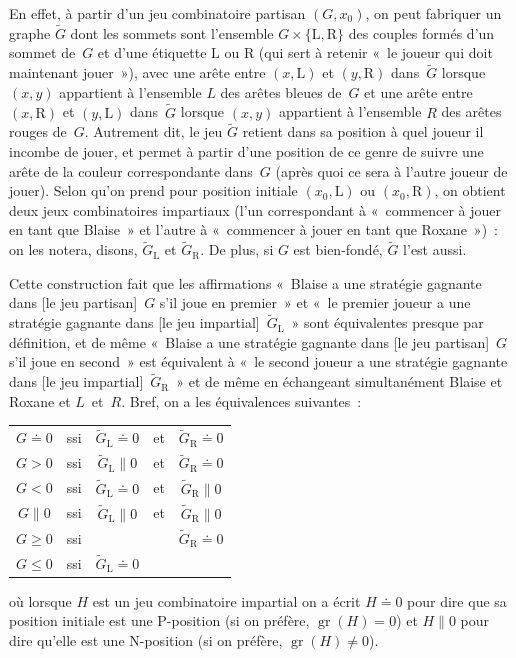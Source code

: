 \documentclass[12pt,a4paper]{article}
\theoremstyle{definition}
\newcommand{\gr}{\operatorname{gr}}
\newcommand{\fuzzy}{\mathrel{\|}}
\begin{document}
En effet, à partir d'un jeu combinatoire partisan $(G,x_0)$, on peut
fabriquer un graphe $\tilde G$ dont les sommets sont l'ensemble $G
\times \{\mathrm{L},\mathrm{R}\}$ des couples formés d'un sommet
de $G$ et d'une étiquette $\mathrm{L}$ ou $\mathrm{R}$ (qui sert à
retenir « le joueur qui doit maintenant jouer »), avec une arête entre
$(x,\mathrm{L})$ et $(y,\mathrm{R})$ dans $\tilde G$ lorsque $(x,y)$
appartient à l'ensemble $L$ des arêtes bleues de $G$ et une arête
entre $(x,\mathrm{R})$ et $(y,\mathrm{L})$ dans $\tilde G$ lorsque
$(x,y)$ appartient à l'ensemble $R$ des arêtes rouges de $G$.
Autrement dit, le jeu $\tilde G$ retient dans sa position à quel
joueur il incombe de jouer, et permet à partir d'une position de ce
genre de suivre une arête de la couleur correspondante dans $G$ (après
quoi ce sera à l'autre joueur de jouer).  Selon qu'on prend pour
position initiale $(x_0,\mathrm{L})$ ou $(x_0,\mathrm{R})$, on obtient
deux jeux combinatoires impartiaux (l'un correspondant à « commencer à
  jouer en tant que Blaise » et l'autre à « commencer à jouer en tant
  que Roxane ») : on les notera, disons, $\tilde G_{\mathrm{L}}$ et
$\tilde G_{\mathrm{R}}$.  De plus, si $G$ est bien-fondé, $\tilde G$
l'est aussi.

Cette construction fait que les affirmations « Blaise a une stratégie
  gagnante dans [le jeu partisan] $G$ s'il joue en premier » et « le
  premier joueur a une stratégie gagnante dans [le jeu
    impartial] $\tilde G_{\mathrm{L}}$ » sont équivalentes presque par
définition, et de même « Blaise a une stratégie gagnante dans [le jeu
    partisan] $G$ s'il joue en second » est équivalent à « le second
  joueur a une stratégie gagnante dans [le jeu impartial] $\tilde
  G_{\mathrm{R}}$ » et de même en échangeant simultanément Blaise et
Roxane et $L$ et $R$.  Bref, on a les équivalences suivantes :
\begin{center}
\begin{tabular}{ccccc}
$G\doteq 0$&ssi&$\tilde G_{\mathrm{L}}\doteq 0$&et&$\tilde G_{\mathrm{R}}\doteq 0$\\
$G>0$&ssi&$\tilde G_{\mathrm{L}}\fuzzy 0$&et&$\tilde G_{\mathrm{R}}\doteq 0$\\
$G<0$&ssi&$\tilde G_{\mathrm{L}}\doteq 0$&et&$\tilde G_{\mathrm{R}}\fuzzy 0$\\
$G\fuzzy 0$&ssi&$\tilde G_{\mathrm{L}}\fuzzy 0$&et&$\tilde G_{\mathrm{R}}\fuzzy 0$\\
$G\geq 0$&ssi&&&$\tilde G_{\mathrm{R}}\doteq 0$\\
$G\leq 0$&ssi&$\tilde G_{\mathrm{L}}\doteq 0$&&\\
\end{tabular}
\end{center}
où lorsque $H$ est un jeu combinatoire impartial on a écrit $H\doteq
0$ pour dire que sa position initiale est une P-position (si on
préfère, $\gr(H) = 0$) et $H\fuzzy 0$ pour dire qu'elle est une
N-position (si on préfère, $\gr(H) \neq 0$).
\end{document}
